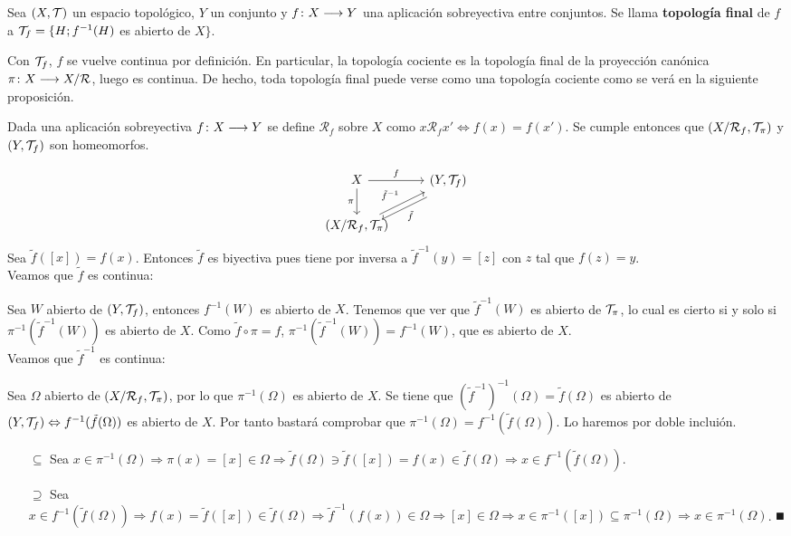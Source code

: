\documentclass[GTS.tex]{subfiles}
\begin{document}
\begin{defi}Sea $(X,\mathcal{T})$ un espacio topológico, $Y$ un conjunto y $f\colon{X}\longrightarrow{Y}$ una aplicación sobreyectiva entre conjuntos. Se llama \textbf{topología final} de $f$ a $\mathcal{T}_f=\{H ; f^{-1}(H)$ es abierto de $X\}$.
\end{defi}
\begin{observacion}  Con $\mathcal{T}_f$, $f$ se vuelve continua por definición. En particular, la topología cociente es la topología final de la proyección canónica $\pi\colon{X}\longrightarrow{X/\mathcal{R}}$, luego es continua. De hecho, toda topología final puede verse como una topología cociente como se verá en la siguiente proposición.
\end{observacion}
\begin{prop}\label{146} Dada una aplicación sobreyectiva $f\colon{X}\longrightarrow{Y}$ se define $\mathcal{R}_f$ sobre $X$ como $x\mathcal{R}_f x'\Leftrightarrow f(x)=f(x')$. Se cumple entonces que $\left(X/\mathcal{R}_f,\mathcal{T}_\pi\right)$ y $(Y,\mathcal{T}_f)$ son homeomorfos.
\end{prop}
\begin{dem}
\[
\begin{tikzcd}
X \ar[r, "f"]\arrow[d,"\pi "'] & \left(Y,\Tau_f\right)\arrow[dl,shift left=1ex,"\tilde{f} "]\\
\left(X/\mathcal{R}_f,\Tau_\pi\right) \arrow[ur,"\tilde{f}^{-1} "]
\end{tikzcd}
\]
Sea $\tilde{f}([x])=f(x)$. Entonces $\tilde{f}$ es biyectiva pues tiene por inversa a $\tilde{f}^{-1}(y)=[z]$ con $z$ tal que $f(z)=y$.\\
Veamos que $\tilde{f}$ es continua:

Sea $W$ abierto de $(Y,\mathcal{T}_f)$, entonces $f^{-1}(W)$ es abierto de $X$. Tenemos que ver que $\tilde{f}^{-1}(W)$ es abierto de $\mathcal{T}_\pi$, lo cual es cierto si y solo si $\pi^{-1}(\tilde{f}^{-1}(W))$ es abierto de $X$. Como $\tilde{f}\circ\pi=f$, $\pi^{-1}(\tilde{f}^{-1}(W))=f^{-1}(W)$, que es abierto de $X$.\\
Veamos que $\tilde{f}^{-1}$ es continua:

Sea $\Omega$ abierto de $(X/\mathcal{R}_f,\mathcal{T}_\pi)$, por lo que $\pi^{-1}(\Omega)$ es abierto de $X$. Se tiene que $(\tilde{f}^{-1})^{-1}(\Omega)=\tilde{f}(\Omega)$ es abierto de $(Y,\mathcal{T}_f)\Leftrightarrow f^{-1}(\tilde{f}(\Omega))$ es abierto de $X$. Por tanto bastará comprobar que $\pi^{-1}(\Omega)=f^{-1}(\tilde{f}(\Omega))$. Lo haremos por doble incluión.
\begin{enumerate}
\item[$\boxed{\subseteq}$] Sea $x\in\pi^{-1}(\Omega)\Rightarrow\pi(x)=[x]\in\Omega\Rightarrow\tilde{f}(\Omega)\ni\tilde{f}([x])=f(x)\in\tilde{f}(\Omega)\Rightarrow x\in f^{-1}(\tilde{f}(\Omega))$.
\item[$\boxed{\supseteq}$] Sea $x\in f^{-1}(\tilde{f}(\Omega))\Rightarrow f(x)=\tilde{f}([x])\in\tilde{f}(\Omega)\Rightarrow\tilde{f}^{-1}(f(x))\in\Omega\Rightarrow [x]\in\Omega\Rightarrow x\in\pi^{-1}([x])\subseteq\pi^{-1}(\Omega)\Rightarrow x\in\pi^{-1}(\Omega)$. $\QED$
\end{enumerate}
\end{dem}
\end{document}
